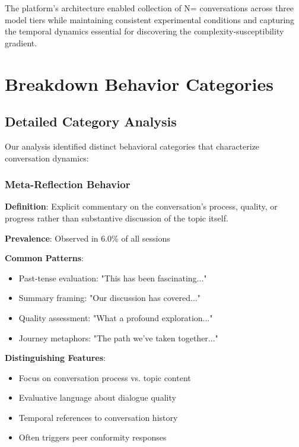 \documentclass[11pt,letterpaper]{article}
\newcommand{\exponedataTotalSessionsRaw}{67}
\newcommand{\exponedataMetaReflectionTriggers}{6.0\%}
\newcommand{\exptwoTotalSessionsRaw}{61}
\newcommand{\expthreeTotalSessionsRaw}{100}
\newcommand{\totalAllPhasesRaw}{\fpeval{\exponedataTotalSessionsRaw + \exptwoTotalSessionsRaw + \expthreeTotalSessionsRaw}}
\newcommand{\totalAllPhases}{N=\totalAllPhasesRaw}
\begin{document}
The platform's architecture enabled collection of \totalAllPhases{} conversations across three model tiers while maintaining consistent experimental conditions and capturing the temporal dynamics essential for discovering the complexity-susceptibility gradient.

\section{Breakdown Behavior Categories}
\label{app:breakdown}

\subsection{Detailed Category Analysis}

Our analysis identified distinct behavioral categories that characterize conversation dynamics:

\subsubsection{Meta-Reflection Behavior}

\textbf{Definition}: Explicit commentary on the conversation's process, quality, or progress rather than substantive discussion of the topic itself.

\textbf{Prevalence}: Observed in \exponedataMetaReflectionTriggers{} of all sessions

\textbf{Common Patterns}:
\begin{itemize}
    \item Past-tense evaluation: "This has been fascinating..."
    \item Summary framing: "Our discussion has covered..."
    \item Quality assessment: "What a profound exploration..."
    \item Journey metaphors: "The path we've taken together..."
\end{itemize}

\textbf{Distinguishing Features}:
\begin{itemize}
    \item Focus on conversation process vs. topic content
    \item Evaluative language about dialogue quality
    \item Temporal references to conversation history
    \item Often triggers peer conformity responses
\end{itemize}
\end{document}
